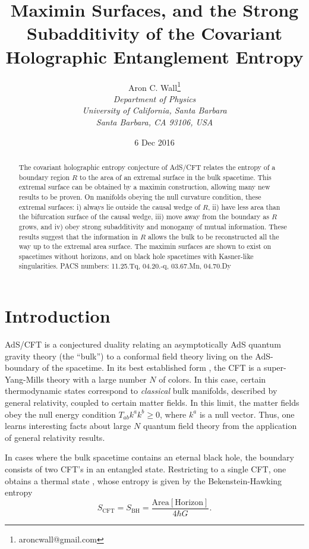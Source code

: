 \documentclass[12pt]{article}
\author{Aron C. Wall\footnote{aroncwall@gmail.com}
\\ \textit{Department of Physics} \\ \textit{University of California, Santa Barbara}
\\ \textit{Santa Barbara, CA 93106, USA} }
\title{Maximin Surfaces, and the Strong Subadditivity of the Covariant Holographic Entanglement Entropy}
\date{6 Dec 2016}
\begin{document}
\maketitle

\begin{abstract}
The covariant holographic entropy conjecture of AdS/CFT relates the entropy of a boundary region $R$ to the area of an extremal surface in the bulk spacetime.  This extremal surface can be obtained by a maximin construction, allowing many new results to be proven.  On manifolds obeying the null curvature condition, these extremal surfaces: i) always lie outside the causal wedge of $R$, ii) have less area than the bifurcation surface of the causal wedge, iii) move away from the boundary as $R$ grows, and iv) obey strong subadditivity and monogamy of mutual information.  These results suggest that the information in $R$ allows the bulk to be reconstructed all the way up to the extremal area surface.  The maximin surfaces are shown to exist on spacetimes without horizons, and on black hole spacetimes with Kasner-like singularities.
\newline\newline
PACS numbers: 11.25.Tq, 04.20.-q, 03.67.Mn, 04.70.Dy
\end{abstract}

\vspace{-.5cm}

\newpage

\tableofcontents

\newpage

\section{Introduction}\label{intro}

AdS/CFT is a conjectured duality relating an asymptotically AdS quantum gravity theory (the ``bulk'') to a conformal field theory living on the AdS-boundary of the spacetime.  In its best established form \cite{AdSCFT}, the CFT is a super-Yang-Mills theory with a large number $N$ of colors.  In this case, certain thermodynamic states correspond to \emph{classical} bulk manifolds, described by general relativity, coupled to certain matter fields.  In this limit, the matter fields obey the null energy condition $T_{ab} k^a k^b \ge 0$, where $k^a$ is a null vector.  Thus, one learns interesting facts about large $N$ quantum field theory from the application of general relativity results.

In cases where the bulk spacetime contains an eternal black hole, the boundary consists of two CFT's in an entangled state.  Restricting to a single CFT, one obtains a thermal state \cite{maldacena01}, whose entropy is given by the Bekenstein-Hawking entropy
\begin{equation}\label{BH}
S_\mathrm{CFT} = S_\mathrm{BH} = \frac{ \mathrm{Area} [ \mathrm{Horizon} ] }{4\hbar G}.
\end{equation}
\end{document}
